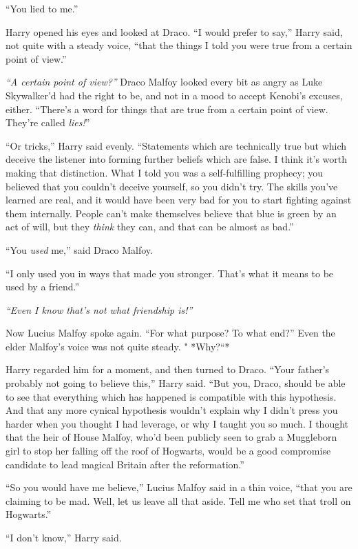 ``You lied to me.''

Harry opened his eyes and looked at Draco. ``I would prefer to say,''
Harry said, not quite with a steady voice, ``that the things I told you
were true from a certain point of view.''

\emph{``A certain point of view?''} Draco Malfoy looked every bit as
angry as Luke Skywalker'd had the right to be, and not in a mood to
accept Kenobi's excuses, either. ``There's a word for things that are
true from a certain point of view. They're called \emph{lies!}''

``Or tricks,'' Harry said evenly. ``Statements which are technically
true but which deceive the listener into forming further beliefs which
are false. I think it's worth making that distinction. What I told you
was a self-fulfilling prophecy; you believed that you couldn't deceive
yourself, so you didn't try. The skills you've learned are real, and it
would have been very bad for you to start fighting against them
internally. People can't make themselves believe that blue is green by
an act of will, but they \emph{think} they can, and that can be almost
as bad.''

``You \emph{used} me,'' said Draco Malfoy.

``I only used you in ways that made you stronger. That's what it means
to be used by a friend.''

\emph{``Even I know that's not what friendship is!''}

Now Lucius Malfoy spoke again. ``For what purpose? To what end?'' Even
the elder Malfoy's voice was not quite steady. " *Why?``*

Harry regarded him for a moment, and then turned to Draco. ``Your
father's probably not going to believe this,'' Harry said. ``But you,
Draco, should be able to see that everything which has happened is
compatible with this hypothesis. And that any more cynical hypothesis
wouldn't explain why I didn't press you harder when you thought I had
leverage, or why I taught you so much. I thought that the heir of House
Malfoy, who'd been publicly seen to grab a Muggleborn girl to stop her
falling off the roof of Hogwarts, would be a good compromise candidate
to lead magical Britain after the reformation.''

``So you would have me believe,'' Lucius Malfoy said in a thin voice,
``that you are claiming to be mad. Well, let us leave all that aside.
Tell me who set that troll on Hogwarts.''

``I don't know,'' Harry said.

